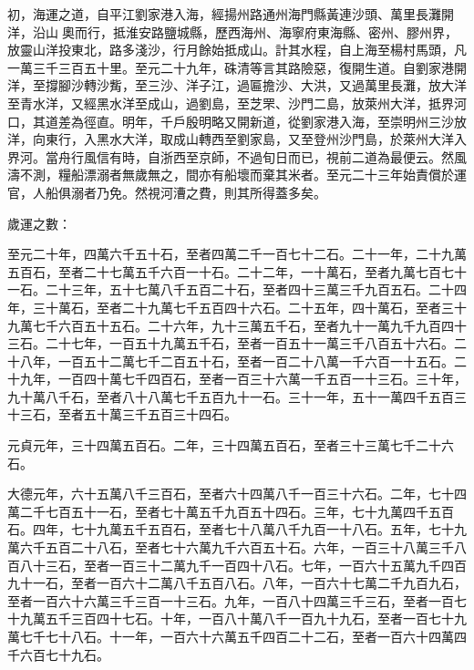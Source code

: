 \begin{pinyinscope}
 初，海運之道，自平江劉家港入海，經揚州路通州海門縣黃連沙頭、萬里長灘開洋，沿山奧而行，抵淮安路鹽城縣，歷西海州、海寧府東海縣、密州、膠州界，放靈山洋投東北，路多淺沙，行月餘始抵成山。計其水程，自上海至楊村馬頭，凡一萬三千三百五十里。至元二十九年，硃清等言其路險惡，復開生道。自劉家港開洋，至撐腳沙轉沙觜，至三沙、洋子江，過匾擔沙、大洪，又過萬里長灘，放大洋至青水洋，又經黑水洋至成山，過劉島，至芝罘、沙門二島，放萊州大洋，抵界河口，其道差為徑直。明年，千戶殷明略又開新道，從劉家港入海，至崇明州三沙放洋，向東行，入黑水大洋，取成山轉西至劉家島，又至登州沙門島，於萊州大洋入界河。當舟行風信有時，自浙西至京師，不過旬日而已，視前二道為最便云。然風濤不測，糧船漂溺者無歲無之，間亦有船壞而棄其米者。至元二十三年始責償於運官，人船俱溺者乃免。然視河漕之費，則其所得蓋多矣。



 歲運之數：



 至元二十年，四萬六千五十石，至者四萬二千一百七十二石。二十一年，二十九萬五百石，至者二十七萬五千六百一十石。二十二年，一十萬石，至者九萬七百七十一石。二十三年，五十七萬八千五百二十石，至者四十三萬三千九百五石。二十四年，三十萬石，至者二十九萬七千五百四十六石。二十五年，四十萬石，至者三十九萬七千六百五十五石。二十六年，九十三萬五千石，至者九十一萬九千九百四十三石。二十七年，一百五十九萬五千石，至者一百五十一萬三千八百五十六石。二十八年，一百五十二萬七千二百五十石，至者一百二十八萬一千六百一十五石。二十九年，一百四十萬七千四百石，至者一百三十六萬一千五百一十三石。三十年，九十萬八千石，至者八十八萬七千五百九十一石。三十一年，五十一萬四千五百三十三石，至者五十萬三千五百三十四石。



 元貞元年，三十四萬五百石。二年，三十四萬五百石，至者三十三萬七千二十六石。



 大德元年，六十五萬八千三百石，至者六十四萬八千一百三十六石。二年，七十四萬二千七百五十一石，至者七十萬五千九百五十四石。三年，七十九萬四千五百石。四年，七十九萬五千五百石，至者七十八萬八千九百一十八石。五年，七十九萬六千五百二十八石，至者七十六萬九千六百五十石。六年，一百三十八萬三千八百八十三石，至者一百三十二萬九千一百四十八石。七年，一百六十五萬九千四百九十一石，至者一百六十二萬八千五百八石。八年，一百六十七萬二千九百九石，至者一百六十六萬三千三百一十三石。九年，一百八十四萬三千三石，至者一百七十九萬五千三百四十七石。十年，一百八十萬八千一百九十九石，至者一百七十九萬七千七十八石。十一年，一百六十六萬五千四百二十二石，至者一百六十四萬四千六百七十九石。




\end{pinyinscope}

